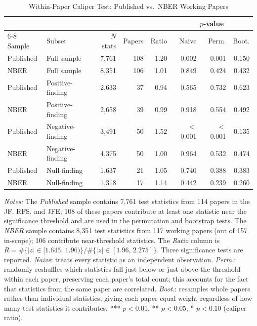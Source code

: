 \documentclass[12pt]{article}
\begin{document}
\begin{table}[H]
\centering
\caption{Within-Paper Caliper Test: Published vs.\ NBER Working Papers}
\label{tab:nber_caliper}
\begin{singlespace}
\small
\begin{tabular}{llrrrrrr}
\hline\hline
 &  &  & & & \multicolumn{3}{c}{$p$-value} \\
\cmidrule(lr){6-8}
Sample & Subset & $N$ stats & Papers & Ratio & Naive & Perm. & Boot. \\
\hline
Published  & Full sample      & 7,761 & 108 & $1.20$\rlap{$^{***}$} & 0.002 & 0.001 & 0.150 \\
NBER       & Full sample      & 8,351 & 106 & 1.01                  & 0.849 & 0.424 & 0.432 \\[4pt]
Published  & Positive-finding & 2,633 & 37  & 0.94                  & 0.565 & 0.732 & 0.623 \\
NBER       & Positive-finding & 2,658 & 39  & 0.99                  & 0.918 & 0.554 & 0.492 \\[4pt]
Published  & Negative-finding & 3,491 & 50  & $1.52$\rlap{$^{***}$} & $<$0.001 & $<$0.001 & 0.135 \\
NBER       & Negative-finding & 4,375 & 50  & 1.00          & 0.964             & 0.532             & 0.474 \\[4pt]
Published  & Null-finding     & 1,637 & 21  & 1.05          & 0.740          & 0.388          & 0.383 \\
NBER       & Null-finding     & 1,318 & 17  & 1.14          & 0.442          & 0.239          & 0.260 \\
\hline\hline
\end{tabular}
\begin{minipage}{\textwidth}
\smallskip
\footnotesize
\textit{Notes:} The \textit{Published} sample contains 7,761 test statistics
from 114 papers in the JF, RFS, and JFE; 108 of these papers contribute at
least one statistic near the significance threshold and are used in the
permutation and bootstrap tests.  The \textit{NBER} sample contains 8,351
test statistics from 117 working papers (out of 157 in-scope); 106 contribute
near-threshold statistics.
The \textit{Ratio} column is
$R = \#\{|z|\in[1.645,\,1.96)\}/\#\{|z|\in[1.96,\,2.275]\}$.
Three significance tests are reported.
\textit{Naive}: treats every statistic as an independent observation.
\textit{Perm.}: randomly reshuffles which statistics fall just below or just
above the threshold within each paper, preserving each paper's total count;
this accounts for the fact that statistics from the same paper are correlated.
\textit{Boot.}: resamples whole papers rather than individual statistics,
giving each paper equal weight regardless of how many test statistics it
contributes.
*** $p < 0.01$, ** $p < 0.05$, * $p < 0.10$ (caliper ratio).
\end{minipage}
\end{singlespace}
\end{table}
\end{document}
